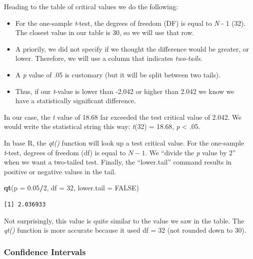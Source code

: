 \documentclass[
  11pt,
]{book}
\newenvironment{Shaded}{\begin{snugshade}}{\end{snugshade}}
\newcommand{\AttributeTok}[1]{\textcolor[rgb]{0.27,0.27,0.27}{#1}}
\newcommand{\ConstantTok}[1]{\textcolor[rgb]{0.37,0.37,0.37}{#1}}
\newcommand{\DecValTok}[1]{\textcolor[rgb]{0.06,0.06,0.06}{#1}}
\newcommand{\FloatTok}[1]{\textcolor[rgb]{0.06,0.06,0.06}{#1}}
\newcommand{\FunctionTok}[1]{\textcolor[rgb]{0.27,0.27,0.27}{\textbf{#1}}}
\newcommand{\NormalTok}[1]{#1}
\newcommand{\SpecialCharTok}[1]{\textcolor[rgb]{0.43,0.43,0.43}{\textbf{#1}}}
\providecommand{\tightlist}{%
  \setlength{\itemsep}{0pt}\setlength{\parskip}{0pt}}
\begin{document}
Heading to the table of critical values we do the following:

\begin{itemize}
\tightlist
\item
  For the one-sample \emph{t}-test, the degrees of freedom (DF) is equal to \emph{N} - 1 (32). The closest value in our table is 30, so we will use that row.
\item
  A priorily, we did not specify if we thought the difference would be greater, or lower. Therefore, we will use a column that indicates \emph{two-tails}.
\item
  A \emph{p} value of .05 is customary (but it will be split between two tails).
\item
  Thus, if our \emph{t}-value is lower than -2.042 or higher than 2.042 we know we have a statistically significant difference.
\end{itemize}

In our case, the \emph{t} value of 18.68 far exceeded the test critical value of 2.042. We would write the statistical string this way: \emph{t}(32) = 18.68, \emph{p} \textless{} .05.

In base R, the \emph{qt()} function will look up a test critical value. For the one-sample \emph{t}-test, degrees of freedom (df) is equal to \(N-1\). We ``divide the \emph{p} value by 2'' when we want a two-tailed test. Finally, the ``lower.tail'' command results in positive or negative values in the tail.

\begin{Shaded}
\begin{Highlighting}[]
\FunctionTok{qt}\NormalTok{(}\AttributeTok{p =} \FloatTok{0.05}\SpecialCharTok{/}\DecValTok{2}\NormalTok{, }\AttributeTok{df =} \DecValTok{32}\NormalTok{, }\AttributeTok{lower.tail =} \ConstantTok{FALSE}\NormalTok{)}
\end{Highlighting}
\end{Shaded}

\begin{verbatim}
[1] 2.036933
\end{verbatim}

Not surprisingly, this value is quite similar to the value we saw in the table. The \emph{qt()} function is more accurate because it used df = 32 (not rounded down to 30).

\hypertarget{confidence-intervals}{%
\subsubsection{Confidence Intervals}\label{confidence-intervals}}
\end{document}
